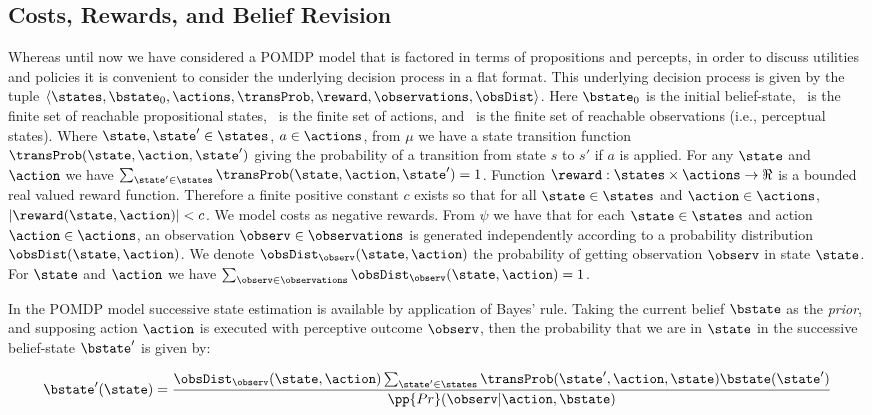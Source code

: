 \subsection{Costs, Rewards, and Belief Revision}

Whereas until now we have considered a POMDP model that is factored in
terms of propositions and percepts, in order to discuss utilities and
policies it is convenient to consider the underlying decision process
in a flat format. This underlying decision process is given by the
tuple $\langle \states, \bstate_0, \actions, \transProb, \reward,
\observations, \obsDist \rangle$. Here $\bstate_0$ is the initial
belief-state, \states\ is the finite set of reachable propositional
states, \actions\ is the finite set of actions, and \observations\ is
the finite set of reachable observations (i.e., perceptual states).
Where $\state, \state' \in \states$, $a \in \actions$, from $\mu$ we
have a state transition function $\transProb(\state, \action,
\state')$ giving the probability of a transition from state $s$ to
$s'$ if $a$ is applied. For any $\state$ and $\action$ we have
$\sum_{\state' \in \states} \transProb(\state, \action, \state') = 1$.
Function $\reward:\states \times \actions \to \Re$ is a bounded real
valued reward function. Therefore a finite positive constant $c$
exists so that for all $\state \in \states$ and $\action \in
\actions$, $|\reward(\state, \action)| < c$. We model costs as
negative rewards.
From $\psi$ we have that for each $\state \in \states$ and action
$\action \in \actions$, an observation $\observ \in \observations$ is
generated independently according to a probability distribution
$\obsDist(\state, \action)$. We denote $\obsDist_\observ(\state,
\action)$ the probability of getting observation $\observ$ in state
$\state$. For $\state$ and $\action$ we have $\sum_{\observ \in
\observations} \obsDist_\observ(\state, \action) = 1$.

In the POMDP model successive state estimation is available by
application of Bayes' rule.  Taking the current belief $\bstate$ as
the {\em prior}, and supposing action $\action$ is executed with
perceptive outcome $\observ$, then the probability that we are in
$\state$ in the successive belief-state $\bstate'$ is given by:

\begin{equation}\label{eq:revision}
\bstate'(\state) = \frac{\obsDist_\observ(\state, \action)
  \sum_{\state'\in \states} \transProb(\state', \action, \state) \bstate(\state') }{\pp{Pr}(\observ | \action, \bstate)}
\end{equation}

